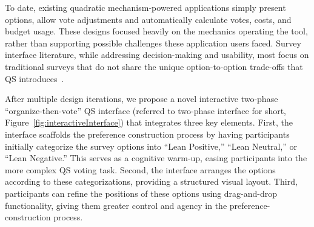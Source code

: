 
To date, existing quadratic mechanism-powered applications simply present options, allow vote adjustments and automatically calculate votes, costs, and budget usage. These designs focused heavily on the mechanics operating the tool, rather than supporting possible challenges these application users faced. Survey interface literature, while addressing decision-making and usability, most focus on traditional surveys that do not share the unique option-to-option trade-offs that QS introduces~\cite{engstrom2020politics, weijtersEffectRatingScale2010, kierujVariationsResponseStyle2010, toepoelSmileysStarsHearts2019, farzandAestheticsEvaluatingResponse2024, pielotDidYouMisclick2024}.~


After multiple design iterations, we propose a novel interactive two-phase ``organize-then-vote'' QS interface (referred to two-phase interface for short, Figure~\ref{fig:interactiveInterface}) that integrates three key elements. First, the interface scaffolds the preference construction process by having participants initially categorize the survey options into ``Lean Positive,'' ``Lean Neutral,'' or ``Lean Negative.'' This serves as a cognitive warm-up, easing participants into the more complex QS voting task. Second, the interface arranges the options according to these categorizations, providing a structured visual layout. Third, participants can refine the positions of these options using drag-and-drop functionality, giving them greater control and agency in the preference-construction process. %

